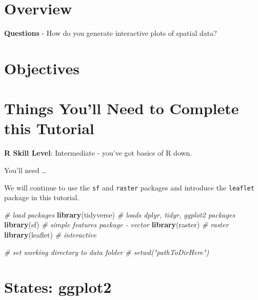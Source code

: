 \documentclass[]{book}
\newenvironment{Shaded}{\begin{snugshade}}{\end{snugshade}}
\newcommand{\KeywordTok}[1]{\textcolor[rgb]{0.13,0.29,0.53}{\textbf{{#1}}}}
\newcommand{\CommentTok}[1]{\textcolor[rgb]{0.56,0.35,0.01}{\textit{{#1}}}}
\newcommand{\NormalTok}[1]{{#1}}
\begin{document}
\section{Overview}\label{overview-1}

\textbf{Questions} - How do you generate interactive plots of spatial
data?

\section{\texorpdfstring{\textbf{Objectives}}{Objectives}}\label{objectives}

\section{Things You'll Need to Complete this
Tutorial}\label{things-youll-need-to-complete-this-tutorial-1}

\textbf{R Skill Level}: Intermediate - you've got basics of R down.

You'll need \ldots{}

We will continue to use the \texttt{sf} and \texttt{raster} packages and
introduce the \texttt{leaflet} package in this tutorial.

\begin{Shaded}
\begin{Highlighting}[]
\CommentTok{# load packages}
\KeywordTok{library}\NormalTok{(tidyverse)  }\CommentTok{# loads dplyr, tidyr, ggplot2 packages}
\KeywordTok{library}\NormalTok{(sf)         }\CommentTok{# simple features package - vector}
\KeywordTok{library}\NormalTok{(raster)     }\CommentTok{# raster}
\KeywordTok{library}\NormalTok{(leaflet)    }\CommentTok{# interactive}

\CommentTok{# set working directory to data folder}
\CommentTok{# setwd("pathToDirHere")}
\end{Highlighting}
\end{Shaded}

\section{States: ggplot2}\label{states-ggplot2}
\end{document}

